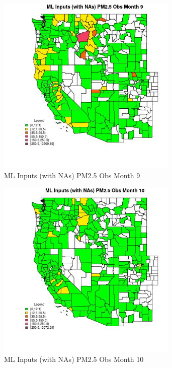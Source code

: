 \begin{figure} 
\centering  
\includegraphics[width=0.77\textwidth]{Code_Outputs/Report_ML_input_PM25_Step4_part_f_de_duplicated_aveswNAs_CountyPM25_ObsmedianMonth9.jpg} 
\caption{\label{fig:Report_ML_input_PM25_Step4_part_f_de_duplicated_aveswNAsCountyPM25_ObsmedianMonth9}ML Inputs (with NAs) PM2.5 Obs Month 9} 
\end{figure} 
 

\begin{figure} 
\centering  
\includegraphics[width=0.77\textwidth]{Code_Outputs/Report_ML_input_PM25_Step4_part_f_de_duplicated_aveswNAs_CountyPM25_ObsmedianMonth10.jpg} 
\caption{\label{fig:Report_ML_input_PM25_Step4_part_f_de_duplicated_aveswNAsCountyPM25_ObsmedianMonth10}ML Inputs (with NAs) PM2.5 Obs Month 10} 
\end{figure} 
 

